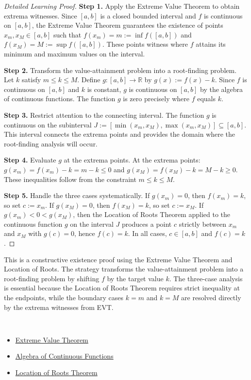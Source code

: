 \begin{proof}[Detailed Learning Proof]
\LRAProofBodyStart

\textbf{Step 1.} Apply the Extreme Value Theorem to obtain extrema witnesses. Since $[a,b]$ is a closed bounded interval and $f$ is continuous on $[a,b]$, the Extreme Value Theorem guarantees the existence of points $x_m, x_M \in [a,b]$ such that $f(x_m) = m := \inf f([a,b])$ and $f(x_M) = M := \sup f([a,b])$. These points witness where $f$ attains its minimum and maximum values on the interval.

\textbf{Step 2.} Transform the value-attainment problem into a root-finding problem. Let $k$ satisfy $m \leq k \leq M$. Define $g : [a,b] \to \mathbb{R}$ by $g(x) := f(x) - k$. Since $f$ is continuous on $[a,b]$ and $k$ is constant, $g$ is continuous on $[a,b]$ by the algebra of continuous functions. The function $g$ is zero precisely where $f$ equals $k$.

\textbf{Step 3.} Restrict attention to the connecting interval. The function $g$ is continuous on the subinterval $J := [\min(x_m, x_M), \max(x_m, x_M)] \subseteq [a,b]$. This interval connects the extrema points and provides the domain where the root-finding analysis will occur.

\textbf{Step 4.} Evaluate $g$ at the extrema points. At the extrema points: $g(x_m) = f(x_m) - k = m - k \leq 0$ and $g(x_M) = f(x_M) - k = M - k \geq 0$. These inequalities follow from the constraint $m \leq k \leq M$.

\textbf{Step 5.} Handle the three cases systematically. If $g(x_m) = 0$, then $f(x_m) = k$, so set $c := x_m$. If $g(x_M) = 0$, then $f(x_M) = k$, so set $c := x_M$. If $g(x_m) < 0 < g(x_M)$, then the Location of Roots Theorem applied to the continuous function $g$ on the interval $J$ produces a point $c$ strictly between $x_m$ and $x_M$ with $g(c) = 0$, hence $f(c) = k$. In all cases, $c \in [a,b]$ and $f(c) = k$.
\end{proof}

\begin{remark*}
This is a constructive existence proof using the Extreme Value Theorem and Location of Roots. The strategy transforms the value-attainment problem into a root-finding problem by shifting $f$ by the target value $k$. The three-case analysis is essential because the Location of Roots Theorem requires strict inequality at the endpoints, while the boundary cases $k = m$ and $k = M$ are resolved directly by the extrema witnesses from EVT.
\end{remark*}

\begin{remark*}[Dependencies]~\\
\begin{itemize}
  \item \hyperref[thm:extreme-value-theorem]{Extreme Value Theorem}
  \item \hyperref[thm:algebra-continuous-functions]{Algebra of Continuous Functions}
  \item \hyperref[thm:location-of-roots]{Location of Roots Theorem}
\end{itemize}
\end{remark*}
